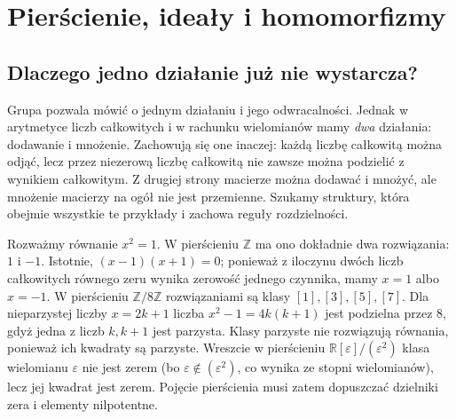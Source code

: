 \setlength{\parskip}{0pt}
\chapter{Pierścienie, ideały i homomorfizmy}
\label{aa:ch:pierscienie}

\section{Dlaczego jedno działanie już nie wystarcza?}
Grupa pozwala mówić o jednym działaniu i jego odwracalności.
Jednak w arytmetyce liczb całkowitych i w rachunku wielomianów
mamy \emph{dwa} działania: dodawanie i mnożenie. Zachowują się one
inaczej: każdą liczbę całkowitą można odjąć, lecz przez niezerową
liczbę całkowitą nie zawsze można podzielić z wynikiem całkowitym.
Z drugiej strony macierze można dodawać i mnożyć, ale mnożenie
macierzy na ogół nie jest przemienne. Szukamy struktury, która
obejmie wszystkie te przykłady i zachowa reguły rozdzielności.

\begin{przyklad}
\label{aa:prz:pierscienie-rownanie}
Rozważmy równanie $x^2=1$. W pierścieniu $\mathbb Z$
ma ono dokładnie dwa rozwiązania: $1$ i $-1$. Istotnie,
$(x-1)(x+1)=0$; ponieważ z iloczynu dwóch liczb całkowitych
równego zeru wynika zerowość jednego czynnika, mamy $x=1$ albo
$x=-1$. W pierścieniu $\mathbb Z/8\mathbb Z$ rozwiązaniami
są klasy $[1],[3],[5],[7]$. Dla nieparzystej liczby $x=2k+1$
liczba $x^2-1=4k(k+1)$ jest podzielna przez $8$, gdyż jedna
z liczb $k,k+1$ jest parzysta. Klasy parzyste nie rozwiązują
równania, ponieważ ich kwadraty są parzyste. Wreszcie w pierścieniu
$\mathbb R[\varepsilon]/(\varepsilon^2)$ klasa wielomianu
$\varepsilon$ nie jest zerem (bo $\varepsilon\notin(\varepsilon^2)$,
co wynika ze stopni wielomianów), lecz jej kwadrat jest zerem.
Pojęcie pierścienia
musi zatem dopuszczać dzielniki zera i elementy nilpotentne.
\end{przyklad}

